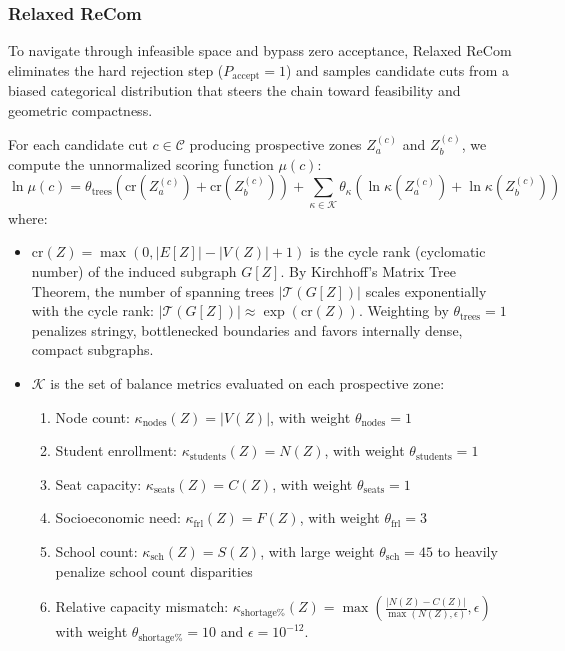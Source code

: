 \documentclass{article}
\begin{document}
\subsubsection{Relaxed ReCom}
To navigate through infeasible space and bypass zero acceptance, Relaxed ReCom eliminates the hard rejection step ($P_{\text{accept}} = 1$) and samples candidate cuts from a biased categorical distribution that steers the chain toward feasibility and geometric compactness.

For each candidate cut $c \in \mathcal{C}$ producing prospective zones $Z_a^{(c)}$ and $Z_b^{(c)}$, we compute the unnormalized scoring function $\mu(c)$:
\begin{equation}
\ln \mu(c) = \theta_{\text{trees}} \left( \text{cr}(Z_a^{(c)}) + \text{cr}(Z_b^{(c)}) \right) + \sum_{\kappa \in \mathcal{K}} \theta_\kappa \left( \ln \kappa(Z_a^{(c)}) + \ln \kappa(Z_b^{(c)}) \right)
\end{equation}
where:
\begin{itemize}
    \item $\text{cr}(Z) = \max(0, |E[Z]| - |V(Z)| + 1)$ is the cycle rank (cyclomatic number) of the induced subgraph $G[Z]$. By Kirchhoff's Matrix Tree Theorem, the number of spanning trees $|\mathcal{T}(G[Z])|$ scales exponentially with the cycle rank: $|\mathcal{T}(G[Z])| \approx \exp(\text{cr}(Z))$. Weighting by $\theta_{\text{trees}} = 1$ penalizes stringy, bottlenecked boundaries and favors internally dense, compact subgraphs.
    \item $\mathcal{K}$ is the set of balance metrics evaluated on each prospective zone:
    \begin{enumerate}
        \item Node count: $\kappa_{\text{nodes}}(Z) = |V(Z)|$, with weight $\theta_{\text{nodes}} = 1$
        \item Student enrollment: $\kappa_{\text{students}}(Z) = N(Z)$, with weight $\theta_{\text{students}} = 1$
        \item Seat capacity: $\kappa_{\text{seats}}(Z) = C(Z)$, with weight $\theta_{\text{seats}} = 1$
        \item Socioeconomic need: $\kappa_{\text{frl}}(Z) = F(Z)$, with weight $\theta_{\text{frl}} = 3$
        \item School count: $\kappa_{\text{sch}}(Z) = S(Z)$, with large weight $\theta_{\text{sch}} = 45$ to heavily penalize school count disparities
        \item Relative capacity mismatch: $\kappa_{\text{shortage\%}}(Z) = \max\left( \frac{|N(Z) - C(Z)|}{\max(N(Z), \epsilon)}, \epsilon \right)$ with weight $\theta_{\text{shortage\%}} = 10$ and $\epsilon = 10^{-12}$.
    \end{enumerate}
\end{itemize}
\end{document}
